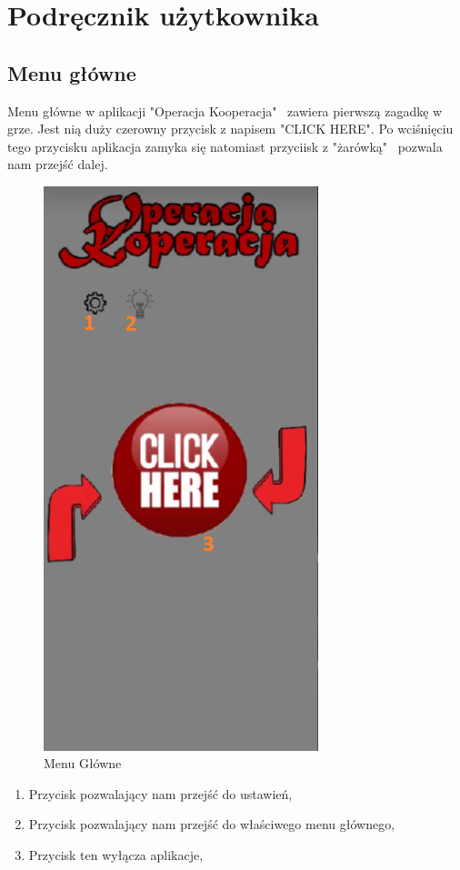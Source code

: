 \newpage
\section{Podręcznik użytkownika}  %
\subsection{Menu główne}
Menu główne w aplikacji "Operacja Kooperacja"~ zawiera pierwszą zagadkę w grze. Jest nią duży czerowny przycisk z napisem "CLICK HERE". Po wciśnięciu tego przycisku aplikacja zamyka się natomiast przyciisk z "żarówką"~ pozwala nam przejść dalej.
	\begin{figure}[!htb]
	\begin{center}
		\includegraphics[width=8cm]{rys/opis1.png}
		\caption{Menu Główne}
		\label{rys:rysunek001}
	\end{center}
\end{figure}

\begin{enumerate}
	\item Przycisk pozwalający nam przejść do ustawień, 
	\item Przycisk pozwalający nam przejść do właściwego menu głównego,
	\item Przycisk ten wyłącza aplikacje, 
\end{enumerate}


